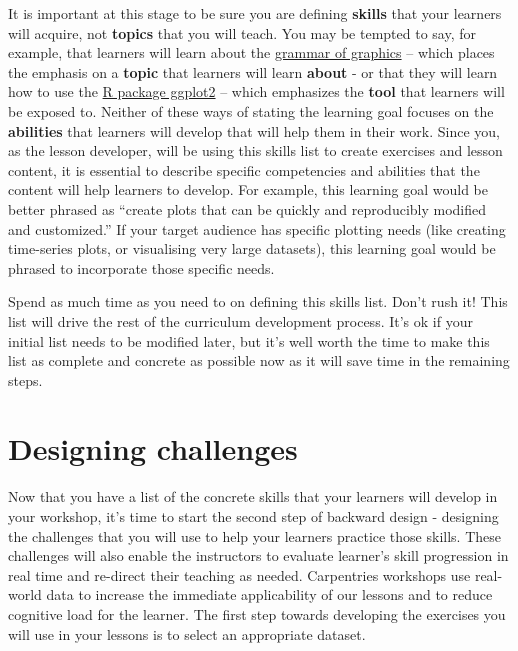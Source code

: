 \documentclass[
]{book}
\begin{document}
It is important at this stage to be sure you are defining \textbf{skills} that your
learners will acquire, not \textbf{topics} that you will teach. You may be tempted to
say, for example, that learners will learn about the \href{https://vita.had.co.nz/papers/layered-grammar.html}{grammar of
graphics} -- which places the
emphasis on a \textbf{topic} that learners will learn \textbf{about} - or that they will
learn how to use the \href{https://ggplot2.tidyverse.org/}{R package ggplot2} -- which
emphasizes the \textbf{tool} that learners will be exposed to. Neither of these ways
of stating the learning goal focuses on the \textbf{abilities} that learners will
develop that will help them in their work. Since you, as the lesson developer,
will be using this skills list to create exercises and lesson content, it is
essential to describe specific competencies and abilities that the content will
help learners to develop. For example, this learning goal would be better
phrased as ``create plots that can be quickly and reproducibly modified and
customized.'' If your target audience has specific plotting needs (like creating
time-series plots, or visualising very large datasets), this learning goal would
be phrased to incorporate those specific needs.

Spend as much time as you need to on defining this skills list. Don't rush it!
This list will drive the rest of the curriculum development process. It's ok if
your initial list needs to be modified later, but it's well worth the time to
make this list as complete and concrete as possible now as it will save time in
the remaining steps.

\hypertarget{designing-challenges}{%
\chapter{Designing challenges}\label{designing-challenges}}

Now that you have a list of the concrete skills that your learners will develop in your
workshop, it's time to start the second step of backward design - designing the
challenges that you will use to help your learners practice those skills. These challenges
will also enable the instructors to evaluate learner's skill progression in real time
and re-direct their teaching as needed. Carpentries workshops use real-world
data to increase the immediate applicability of our lessons and to reduce cognitive load
for the learner. The first step towards developing the exercises you will use in your
lessons is to select an appropriate dataset.
\end{document}
